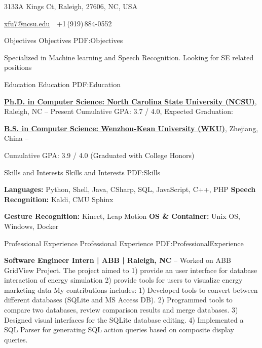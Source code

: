 \documentclass[letterpaper,MMMyyyy,nonstopmode]{simpleresumecv}
\newcommand{\CVAuthor}{Xiaoting Fu}
\begin{document}

\Title{\CVAuthor}

\begin{SubTitle}
{3133A Kings Ct, Raleigh, 27606, NC, USA}
\par
\href{mailto:xfu7@ncsu.edu}
{xfu7@ncsu.edu}
\,\SubBulletSymbol\,
+1\,(919)\,884-0552
\
\end{SubTitle}
\begin{Body}


\Section
{Objectives}
{Objectives}
{PDF:Objectives}

\Entry
Specialized in Machine learning and Speech Recognition. Looking for SE related positions

\Section
{Education}
{Education}
{PDF:Education}

\Entry
\href{http://www.ncsu.edu}
{\textbf{Ph.D. in \href{https://www.csc.ncsu.edu/}
{Computer Science}: North Carolina State University (NCSU)}}, Raleigh, NC
\hfill
{} --
Present
\BulletItem
Cumulative GPA: 3.7 / 4.0, Expected Graduation: 
\BigGap

\Entry
\href{http://www.wku.edu.cn}
{\textbf{B.S. in
\href{http://www.cs.wku.edu.cn}
{Computer Science}: Wenzhou-Kean University (WKU)}}, Zhejiang, China
\hfill
{} --

\BulletItem
Cumulative GPA: 3.9 / 4.0 (Graduated with College Honors)


\Section
{Skills and Interests}
{Skills and Interests}
{PDF:Skills}

\Entry
\textbf{Languages:} Python, Shell, Java, CSharp, SQL, JavaScript, C++, PHP \hfill  \textbf{Speech Recognition:} Kaldi, CMU Sphinx

\textbf{Gesture Recognition:} Kinect, Leap Motion \hfill \textbf{OS \& Container:}  Unix OS, Windows, Docker




\Section
{Professional Experience}
{Professional Experience}
{PDF:ProfessionalExperience}

\Entry
{\textbf{Software Engineer Intern | ABB | Raleigh, NC}}
\hfill
{} --
\BulletItem
Worked on ABB GridView Project. The project aimed to 1) provide an user interface for database interaction of energy simulation 2) provide tools for users to visualize energy marketing data
\BulletItem
My contributions includes: 1) Developed tools to convert between different databases (SQLite and MS Access DB). 2) Programmed tools to compare two databases, review comparison results and merge databases. 3) Designed visual interfaces for the SQLite database editing. 4) Implemented a SQL Parser for generating SQL action queries based on composite display queries.


\end{Body}
\end{document}
